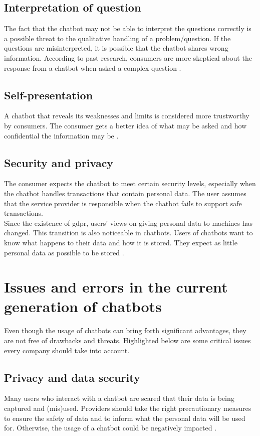 \subsection{Interpretation of question}
The fact that the chatbot may not be able to interpret the questions correctly is a possible threat to the qualitative handling of a problem/question. If the questions are misinterpreted, it is possible that the chatbot shares wrong information. According to past research, consumers are more skeptical about the response from a chatbot when asked a complex question \citep{Folstad2018,Nordheim2019}.

\subsection{Self-presentation}
A chatbot that reveals its weaknesses and limits is considered more trustworthy by consumers. The consumer gets a better idea of what may be asked and how confidential the information may be \citep{Folstad2018}.

\subsection{Security and privacy}
The consumer expects the chatbot to meet certain security levels, especially when the chatbot handles transactions that contain personal data. The user assumes that the service provider is responsible when the chatbot fails to support safe transactions.\\
Since the existence of \acrfull{gdpr}, users' views on giving personal data to machines has changed. This transition is also noticeable in chatbots. Users of chatbots want to know what happens to their data and how it is stored. They expect as little personal data as possible to be stored \citep{Folstad2018, Nordheim2019}. 

\section{Issues and errors in the current generation of chatbots}
Even though the usage of chatbots can bring forth significant advantages, they are not free of drawbacks and threats. Highlighted below are some critical issues every company should take into account.

\subsection{Privacy and data security}
Many users who interact with a chatbot are scared that their data is being captured and (mis)used. Providers should take the right precautionary measures to ensure the safety of data and to inform what the personal data will be used for. Otherwise, the usage of a chatbot could be negatively impacted \citep{Adamopoulou2020, Duka2021, Rese2020}.

